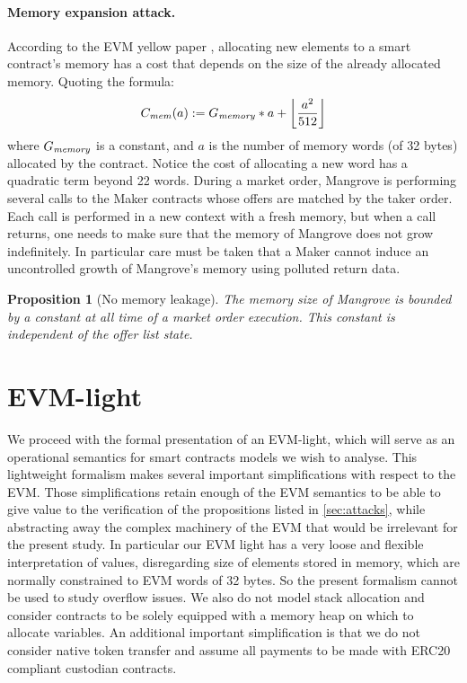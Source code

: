\documentclass[12pt]{extarticle}
\newtheorem{proposition}{Proposition}
\begin{document}
\paragraph{Memory expansion attack.}
According to the EVM yellow paper \cite{Ethereum}, allocating new elements to a smart contract's memory has a cost that depends on the size of the already allocated memory. Quoting the formula:
$$
C_{\it mem}(a) := G_{\it memory}*a+\left\lfloor\dfrac{a^2}{512}\right\rfloor
$$
where $G_{\it memory}$ is a constant, and $a$ is the number of memory words (of 32 bytes) allocated by the contract. Notice the cost of allocating a new word has a quadratic term beyond 22 words. During a market order, Mangrove is performing several calls to the Maker contracts whose offers are matched by the taker order. Each call is performed in a new context with a fresh memory, but when a call returns, one needs to make sure that the memory of Mangrove does not grow indefinitely. In particular care must be taken that a Maker cannot induce an uncontrolled growth of Mangrove's memory using polluted return data. 

\begin{proposition}[No memory leakage]
The memory size of Mangrove is bounded by a constant at all time of a market order execution. This constant is independent of the offer list state.
\end{proposition}

\section{EVM-light}
We proceed with the formal presentation of an EVM-light, which will serve as an operational semantics for smart contracts models we wish to analyse. This lightweight formalism makes several important simplifications with respect to the EVM. Those simplifications retain enough of the EVM semantics to be able to give value to the verification of the propositions listed in \autoref{sec:attacks}, while abstracting away the complex machinery of the EVM that would be irrelevant for the present study. In particular our EVM light has a very loose and flexible interpretation of values, disregarding size of elements stored in memory, which are normally constrained to EVM words of 32 bytes. So the present formalism cannot be used to study overflow issues. We also do not model stack allocation and consider contracts to be solely equipped with a memory heap on which to allocate variables. An additional important simplification is that we do not consider native token transfer and assume all payments to be made with ERC20 compliant custodian contracts.
\end{document}
